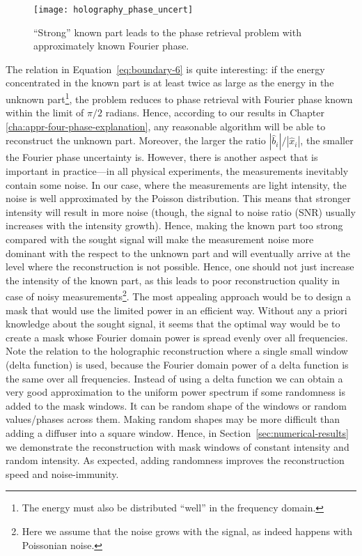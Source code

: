 \begin{figure}[H]
  \centering
  \texttt{[image: holography\_phase\_uncert]}
  \caption{``Strong'' known part leads to the phase retrieval problem
    with approximately known Fourier phase.}
  \label{fig:strong-boundary}
\end{figure}
The relation in Equation~\eqref{eq:boundary-6} is quite interesting:
if the energy concentrated in the known part is at least twice as
large as the energy in the unknown part\footnote{The energy must also
  be distributed ``well'' in the frequency domain.}, the problem
reduces to phase retrieval with Fourier phase known within the limit
of $\pi/2$ radians. Hence, according to our results in Chapter
\ref{cha:appr-four-phase-explanation}, any reasonable algorithm will be
able to reconstruct the unknown part. Moreover, the larger the ratio
$|\hat{b}_{i}|/|\hat{x}_{i}|$, the smaller the Fourier phase
uncertainty is.  However, there is another aspect that is important in
practice---in all physical experiments, the measurements
inevitably contain some noise. In our case, where the measurements are
light intensity, the noise is well approximated by the Poisson
distribution. This means that stronger intensity will result in more
noise (though, the signal to noise ratio (SNR) usually increases with
the intensity growth). Hence, making the known part too strong
compared with the sought signal will make the measurement noise more
dominant with the respect to the unknown part and will eventually
arrive at the level where the reconstruction is not possible. Hence,
one should not just increase the intensity of the known part, as this leads
to poor reconstruction quality in case of noisy
measurements\footnote{Here we assume that the noise grows with the
  signal, as indeed happens with Poissonian noise.}. The most
appealing approach would be to design a mask that would use the
limited power in an efficient way. Without any a priori knowledge
about the sought signal, it seems that the optimal way would be to
create a mask whose Fourier domain power is spread evenly over all
frequencies. Note the relation to the holographic reconstruction where
a single small window (delta function) is used, because the Fourier domain
power of a delta function is the same over all frequencies. Instead of
using a delta function we can obtain a very good approximation to the
uniform power spectrum if some randomness is added to the mask
windows. It can be random shape of the windows or random
values/phases across them. Making random shapes may be more difficult
than adding a diffuser into a square window. Hence, in
Section~\ref{sec:numerical-results} we demonstrate the reconstruction
with mask windows of constant intensity and random intensity. As
expected, adding randomness improves the reconstruction speed and
noise-immunity.

